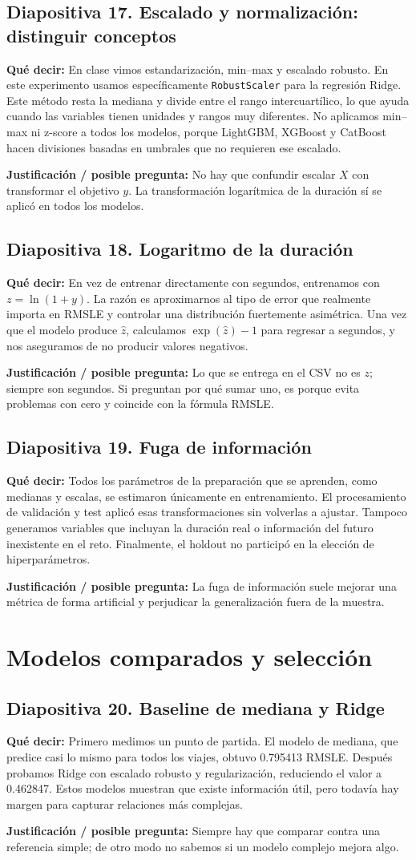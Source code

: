 \documentclass[11pt,letterpaper]{article}
\newcommand{\lamina}[2]{\subsection*{Diapositiva #1. #2}}
\newcommand{\explica}[1]{\noindent\textcolor{azul}{\textbf{Qué decir:}} #1\par\smallskip}
\newcommand{\defiende}[1]{\noindent\textcolor{verde}{\textbf{Justificación / posible pregunta:}} #1\par\medskip}
\begin{document}
\lamina{17}{Escalado y normalización: distinguir conceptos}
\explica{En clase vimos estandarización, min--max y escalado robusto. En este experimento usamos específicamente \texttt{RobustScaler} para la regresión Ridge. Este método resta la mediana y divide entre el rango intercuartílico, lo que ayuda cuando las variables tienen unidades y rangos muy diferentes. No aplicamos min--max ni z-score a todos los modelos, porque LightGBM, XGBoost y CatBoost hacen divisiones basadas en umbrales que no requieren ese escalado.}
\defiende{No hay que confundir escalar $X$ con transformar el objetivo $y$. La transformación logarítmica de la duración sí se aplicó en todos los modelos.}

\lamina{18}{Logaritmo de la duración}
\explica{En vez de entrenar directamente con segundos, entrenamos con $z=\ln(1+y)$. La razón es aproximarnos al tipo de error que realmente importa en RMSLE y controlar una distribución fuertemente asimétrica. Una vez que el modelo produce $\widehat z$, calculamos $\exp(\widehat z)-1$ para regresar a segundos, y nos aseguramos de no producir valores negativos.}
\defiende{Lo que se entrega en el CSV no es $z$; siempre son segundos. Si preguntan por qué sumar uno, es porque evita problemas con cero y coincide con la fórmula RMSLE.}

\lamina{19}{Fuga de información}
\explica{Todos los parámetros de la preparación que se aprenden, como medianas y escalas, se estimaron únicamente en entrenamiento. El procesamiento de validación y test aplicó esas transformaciones sin volverlas a ajustar. Tampoco generamos variables que incluyan la duración real o información del futuro inexistente en el reto. Finalmente, el holdout no participó en la elección de hiperparámetros.}
\defiende{La fuga de información suele mejorar una métrica de forma artificial y perjudicar la generalización fuera de la muestra.}

\section{Modelos comparados y selección}
\lamina{20}{Baseline de mediana y Ridge}
\explica{Primero medimos un punto de partida. El modelo de mediana, que predice casi lo mismo para todos los viajes, obtuvo 0.795413 RMSLE. Después probamos Ridge con escalado robusto y regularización, reduciendo el valor a 0.462847. Estos modelos muestran que existe información útil, pero todavía hay margen para capturar relaciones más complejas.}
\defiende{Siempre hay que comparar contra una referencia simple; de otro modo no sabemos si un modelo complejo mejora algo.}
\end{document}
